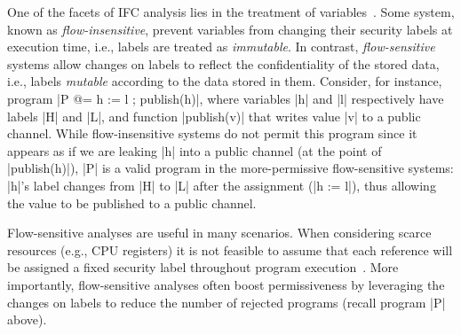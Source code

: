 One of the facets of IFC analysis lies in the treatment of
variables~\cite{Hunt:2006}. Some system, known as \emph{flow-insensitive},
prevent variables from changing their security labels at execution time, i.e., labels
are treated as \emph{immutable}. In contrast, \emph{flow-sensitive} systems
allow changes on labels to reflect the confidentiality of the stored data, i.e.,
labels \emph{mutable} according to the data stored in them.
Consider, for instance, program |P @= h := l ; publish(h)|, where variables |h| and |l| respectively have labels |H| and |L|, and
function |publish(v)| that writes value |v| to a public channel.
%
While flow-insensitive systems do not permit this program since it appears as
if we are leaking |h| into a public channel (at the point of |publish(h)|), |P|
is a valid program in the more-permissive flow-sensitive systems: |h|'s label
changes from |H| to |L| after the assignment (|h := l|), thus allowing the
value to be published to a public channel.


Flow-sensitive analyses are useful in many scenarios. When considering scarce
resources (e.g., CPU registers) it is not feasible to assume that each
reference will be assigned a fixed security label throughout program
execution~\cite{BonelliCM05}. More importantly, flow-sensitive analyses often
boost permissiveness by leveraging the changes on labels to reduce the number
of rejected programs (recall program |P| above). 



